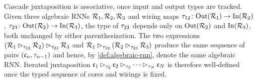 \documentclass{article}
\begin{document}
\begin{remark}\label{rem:typed-associativity}
Cascade juxtaposition is associative, once input and output types are tracked. 
Given three algebraic RNNs $\mathcal{R}_1, \mathcal{R}_2, \mathcal{R}_3$ and wiring maps $\tau_{12} \colon \mathrm{Out}(\mathcal{R}_1) \to \mathrm{In}(\mathcal{R}_2)$, $\tau_{23} \colon \mathrm{Out}(\mathcal{R}_2) \to \mathrm{In}(\mathcal{R}_3)$, the type of $\tau_{23}$ depends only on $\mathrm{Out}(\mathcal{R}_2)$ and $\mathrm{In}(\mathcal{R}_3)$, both unchanged by either parenthesization. 
The two expressions $(\mathcal{R}_1 \mathbin{\rhd_{\tau_{12}}} \mathcal{R}_2) \mathbin{\rhd_{\tau_{23}}} \mathcal{R}_3$ and $\mathcal{R}_1 \mathbin{\rhd_{\tau_{12}}} (\mathcal{R}_2 \mathbin{\rhd_{\tau_{23}}} \mathcal{R}_3)$ produce the same sequence of pairs $(\mathfrak{c}_n, \tau_{n-1})$ and hence, by \cref{def:algebraic-rnn}, denote the same algebraic RNN.
Iterated juxtaposition $\mathfrak{c}_1 \mathbin{\rhd_{\tau_2}} \mathfrak{c}_2 \mathbin{\rhd_{\tau_3}} \cdots \mathbin{\rhd_{\tau_N}} \mathfrak{c}_N$ is therefore well-defined once the typed sequence of cores and wirings is fixed.
\end{remark}
\end{document}
